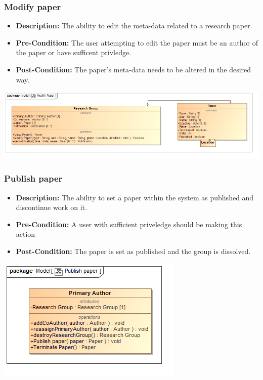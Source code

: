 \documentclass[11pt]{article}
\begin{document}
		\subsubsection{Modify paper}
		\begin{itemize}
			\item \textbf{Description: }The ability to edit the meta-data related to a research paper.
			\item \textbf{Pre-Condition: }The user attempting to edit the paper must be an author of the paper or have sufficent privledge.
			\item \textbf{Post-Condition: }The paper's meta-data needs to be altered in the desired way.
		\end{itemize}
		\begin{center}
			\includegraphics[width=\textwidth]{../Diagrams/DomainModel/ModifyPaper.png}\\[0.5cm]
		\end{center}
		\newpage
		\subsubsection{Publish paper}
		\begin{itemize}
			\item \textbf{Description: }The ability to set a paper within the system as published and discontinue work on it.
			\item \textbf{Pre-Condition: }A user with sufficient priveledge should be making this action
			\item \textbf{Post-Condition: }The paper is set as published and the group is dissolved.
		\end{itemize}
		\begin{center}
			\includegraphics[width=\textwidth]{../Diagrams/DomainModel/Publishpaper.png}\\[0.5cm]
		\end{center}
		\newpage
\end{document}
